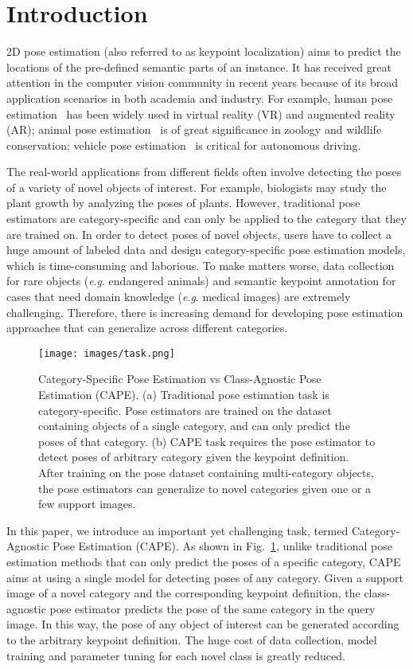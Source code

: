 \documentclass[runningheads]{llncs}
\newcommand{\eg}{\textit{e}.\textit{g}. }
\begin{document}
\section{Introduction}

2D pose estimation (also referred to as keypoint localization) aims to predict the locations of the pre-defined semantic parts of an instance. It has received great attention in the computer vision community in recent years because of its broad application scenarios in both academia and industry. For example, human pose estimation~\cite{mpii} has been widely used in virtual reality (VR) and augmented reality (AR); animal pose estimation~\cite{yu2021ap} is of great significance in zoology and wildlife conservation; vehicle pose estimation~\cite{reddy2018carfusion} is critical for autonomous driving. 

The real-world applications from different fields often involve detecting the poses of a variety of novel objects of interest. 
For example, biologists may study the plant growth by analyzing the poses of plants. However, traditional pose estimators are category-specific and can only be applied to the category that they are trained on. In order to detect poses of novel objects, users have to collect a huge amount of labeled data and design category-specific pose estimation models, which is time-consuming and laborious. To make matters worse, data collection for rare objects (\eg endangered animals) and semantic keypoint annotation for cases that need domain knowledge (\eg medical images) are extremely challenging. Therefore, there is increasing demand for developing pose estimation approaches that can generalize across different categories.

\begin{figure}[t]
	\centering
	\texttt{[image: images/task.png]}
	\caption{Category-Specific Pose Estimation vs Class-Agnostic Pose Estimation (CAPE). (a) Traditional pose estimation task is category-specific. Pose estimators are trained on the dataset containing objects of a single category, and can only predict the poses of that category. (b) CAPE task requires the pose estimator to detect poses of arbitrary category given the keypoint definition. After training on the pose dataset containing multi-category objects, the pose estimators can generalize to novel categories given one or a few support images.}
	\label{fig:intro}
\end{figure}

In this paper, we introduce an important yet challenging task, termed Category-Agnostic Pose Estimation (CAPE). As shown in Fig.~\ref{fig:intro}, unlike traditional pose estimation methods that can only predict the poses of a specific category, CAPE aims at using a single model for detecting poses of any category. Given a support image of a novel category and the corresponding keypoint definition, the class-agnostic pose estimator predicts the pose of the same category in the query image. In this way, the pose of any object of interest can be generated according to the arbitrary keypoint definition. The huge cost of data collection, model training and parameter tuning for each novel class is greatly reduced.
\end{document}
